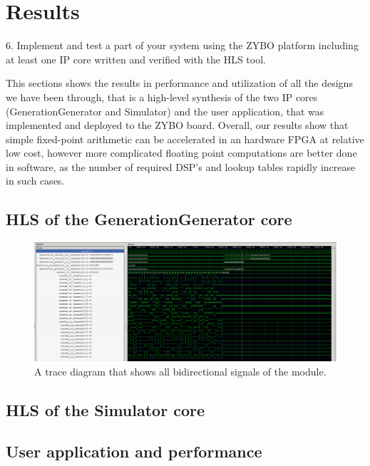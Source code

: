 \section{Results}\label{sec:results}
\begin{framed}
6. Implement and test a part of your system using the ZYBO platform including at least one IP core written and verified with the HLS tool.
\end{framed}

This sections shows the results in performance and utilization of all the designs we have been through, that is a high-level synthesis of the two IP cores (GenerationGenerator and Simulator) and the user application, that was implemented and deployed to the ZYBO board. Overall, our results show that simple fixed-point arithmetic can be accelerated in an hardware FPGA at relative low cost, however more complicated floating point computations are better done in software, as the number of required DSP's and lookup tables rapidly increase in such cases.

\subsection{HLS of the GenerationGenerator core}

\begin{figure}[h]
	\centering
	\includegraphics[width=1.0\linewidth]{../diagrams/GenerationGeneratorSim.png}
	\caption{A trace diagram that shows all bidirectional signals of the module.}
	\label{fig:generationgeneratortrace}
\end{figure}

\subsection{HLS of the Simulator core}
\subsection{User application and performance}




